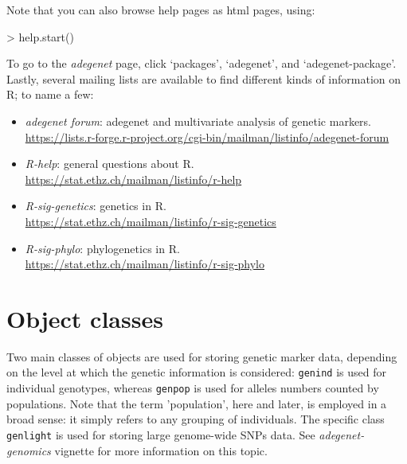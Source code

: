 \documentclass{article}
\begin{document}
Note that you can also browse help pages as html pages, using:
\begin{Schunk}
\begin{Sinput}
> help.start()
\end{Sinput}
\end{Schunk}
To go to the \textit{adegenet} page, click `packages', `adegenet', and
`adegenet-package'.
\\


Lastly, several mailing lists are available to find different kinds of
information on R; to name a few:
\begin{itemize}
\item \textit{adegenet forum}: adegenet and multivariate analysis of genetic markers.\\
  \url{https://lists.r-forge.r-project.org/cgi-bin/mailman/listinfo/adegenet-forum}
\item \textit{R-help}: general questions about R.\\
  \url{https://stat.ethz.ch/mailman/listinfo/r-help}
\item \textit{R-sig-genetics}: genetics in R.\\
  \url{https://stat.ethz.ch/mailman/listinfo/r-sig-genetics}
\item \textit{R-sig-phylo}: phylogenetics in R.\\
  \url{https://stat.ethz.ch/mailman/listinfo/r-sig-phylo}
\end{itemize}






\newpage
\section{Object classes}

Two main classes of objects are used for storing
genetic marker data, depending on the level at which the genetic information is considered:
\texttt{genind} is used for individual genotypes, whereas \texttt{genpop} is used for alleles
numbers counted by populations.  Note that the term 'population', here and later, is employed in a
broad sense: it simply refers to any grouping of individuals.  The specific class \texttt{genlight}
is used for storing large genome-wide SNPs data.  See \textit{adegenet-genomics} vignette for more
information on this topic.
\end{document}
